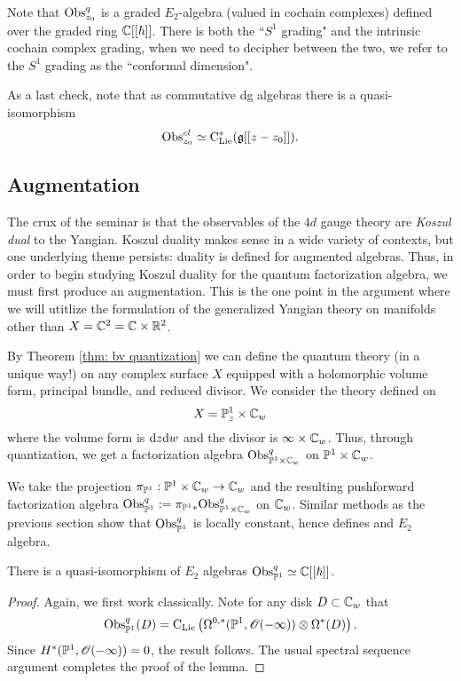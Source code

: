 \documentclass[11pt]{amsart}
\begin{document}
Note that ${\rm Obs}^{q}_{z_0}$ is a graded $E_2$-algebra (valued in cochain complexes) defined over the graded ring $\mathbb C[[\hbar]]$. 
There is both the ``$S^1$ grading" and the intrinsic cochain complex grading, when we need to decipher between the two, we refer to the $S^1$ grading as the ``conformal dimension".

As a last check, note that as commutative dg algebras there is a quasi-isomorphism
\[
{\rm Obs}^{cl}_{z_0} \simeq {\rm C}_{{\rm Lie}}^*(\mathfrak g[[z-z_0]]) .
\] 

\subsection{Augmentation}

The crux of the seminar is that the observables of the $4d$ gauge theory are {\em Koszul dual} to the Yangian. 
Koszul duality makes sense in a wide variety of contexts, but one underlying theme persists: duality is defined for augmented algebras. 
Thus, in order to begin studying Koszul duality for the quantum factorization algebra, we must first produce an augmentation. 
This is the one point in the argument where we will utitlize the formulation of the generalized Yangian theory on manifolds other than $X = \mathbb C^2 = \mathbb C \times \mathbb R^2$. 

By Theorem \ref{thm: bv quantization} we can define the quantum theory (in a unique way!) on any complex surface $X$ equipped with a holomorphic volume form, principal bundle, and reduced divisor. 
We consider the theory defined on
\[
X = \mathbb P^1_z \times \mathbb C_w
\]
where the volume form is ${\rm d} z {\rm d} w$ and the divisor is $\infty \times \mathbb C_w$. 
Thus, through quantization, we get a factorization algebra ${\rm Obs}^{q}_{\mathbb P^1 \times \mathbb C_w}$ on $\mathbb P^1 \times \mathbb C_w$. 

We take the projection $\pi_{\mathbb P^1} : \mathbb P^1 \times \mathbb C_w \to \mathbb C_w$ and the resulting pushforward factorization algebra ${\rm Obs}^q_{\mathbb P^1} := \pi_{\mathbb P^1 *} {\rm Obs}^q_{\mathbb P^1 \times \mathbb C_w}$ on $\mathbb C_w$. 
Similar methods as the previous section show that ${\rm Obs}^q_{\mathbb P^1}$ is locally constant, hence defines and $E_2$ algebra. 

\begin{lem}
There is a quasi-isomorphism of $E_2$ algebras ${\rm Obs}^q_{\mathbb P^1} \simeq \mathbb C[[\hbar]]$. 
\end{lem}
\begin{proof}
Again, we first work classically. 
Note for any disk $D \subset \mathbb C_w$ that
\[
{\rm Obs}^q_{\mathbb P^1}(D) = {\rm C}_{{\rm Lie}}\left(\Omega^{0,*}(\mathbb P^1, \mathscr O(-\infty)) \otimes \Omega^*(D)\right) .
\]  
Since $H^*(\mathbb P^1 , \mathscr O(-\infty)) = 0$, the result follows. 
The usual spectral sequence argument completes the proof of the lemma. 
\end{proof}
\end{document}
